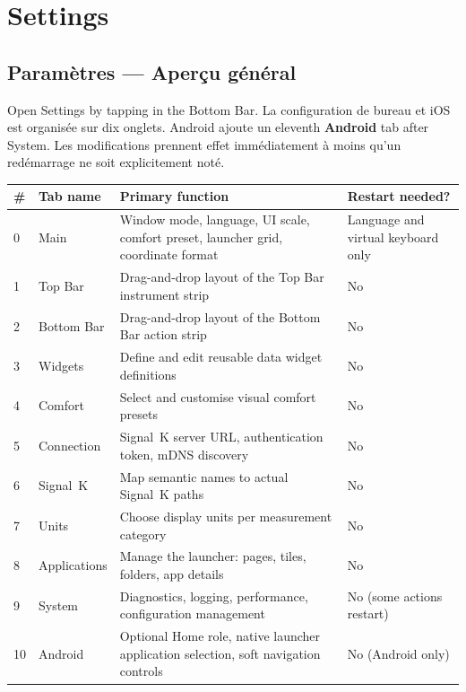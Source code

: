 \part{Settings}

\chapter{Paramètres --- Aperçu général}
\label{ch:settings}

Open Settings by tapping  in the Bottom Bar.
La configuration de bureau et iOS est organisée sur dix onglets. Android ajoute un
eleventh \textbf{Android} tab after System.
Les modifications prennent effet immédiatement à moins qu'un redémarrage ne soit explicitement noté.


\begin{longtable}{C{0.6cm}L{3.0cm}L{6.8cm}L{3.3cm}}
\toprule
{}
\color{white}\sffamily\bfseries \# &
\color{white}\sffamily\bfseries Tab name &
\color{white}\sffamily\bfseries Primary function &
\color{white}\sffamily\bfseries Restart needed? \\
 & Main           & Window mode, language, UI scale, comfort preset, launcher grid, coordinate format & Language and virtual keyboard only \\
1 & Top Bar        & Drag-and-drop layout of the Top Bar instrument strip & No \\
2 & Bottom Bar     & Drag-and-drop layout of the Bottom Bar action strip & No \\
3 & Widgets        & Define and edit reusable data widget definitions & No \\
4 & Comfort        & Select and customise visual comfort presets & No \\
5 & Connection     & Signal~K server URL, authentication token, mDNS discovery & No \\
6 & Signal~K       & Map semantic names to actual Signal~K paths & No \\
7 & Units          & Choose display units per measurement category & No \\
8 & Applications   & Manage the launcher: pages, tiles, folders, app details & No \\
9 & System         & Diagnostics, logging, performance, configuration management & No (some actions restart) \\
10 & Android       & Optional Home role, native launcher application selection, soft navigation controls & No (Android only) \\
\bottomrule
\end{longtable}

